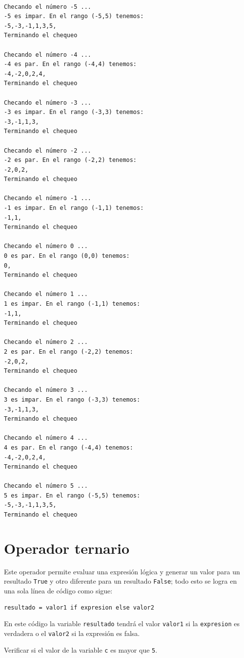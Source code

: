\documentclass[
  spanish,
  letterpaper,
]{scrbook}
\theoremstyle{definition}
\theoremstyle{remark}
\newcounter{quartocalloutexmno}
\newcommand{\quartocalloutexm}[1]{\refstepcounter{quartocalloutexmno}\label{#1}}
\begin{document}
\begin{verbatim}

Checando el número -5 ...
-5 es impar. En el rango (-5,5) tenemos:
-5,-3,-1,1,3,5,
Terminando el chequeo

Checando el número -4 ...
-4 es par. En el rango (-4,4) tenemos:
-4,-2,0,2,4,
Terminando el chequeo

Checando el número -3 ...
-3 es impar. En el rango (-3,3) tenemos:
-3,-1,1,3,
Terminando el chequeo

Checando el número -2 ...
-2 es par. En el rango (-2,2) tenemos:
-2,0,2,
Terminando el chequeo

Checando el número -1 ...
-1 es impar. En el rango (-1,1) tenemos:
-1,1,
Terminando el chequeo

Checando el número 0 ...
0 es par. En el rango (0,0) tenemos:
0,
Terminando el chequeo

Checando el número 1 ...
1 es impar. En el rango (-1,1) tenemos:
-1,1,
Terminando el chequeo

Checando el número 2 ...
2 es par. En el rango (-2,2) tenemos:
-2,0,2,
Terminando el chequeo

Checando el número 3 ...
3 es impar. En el rango (-3,3) tenemos:
-3,-1,1,3,
Terminando el chequeo

Checando el número 4 ...
4 es par. En el rango (-4,4) tenemos:
-4,-2,0,2,4,
Terminando el chequeo

Checando el número 5 ...
5 es impar. En el rango (-5,5) tenemos:
-5,-3,-1,1,3,5,
Terminando el chequeo
\end{verbatim}

\section{Operador ternario}\label{operador-ternario}

Este operador permite evaluar una expresión lógica y generar un valor
para un resultado \texttt{True} y otro diferente para un resultado
\texttt{False}; todo esto se logra en una sola línea de código como
sigue:

\begin{verbatim}
resultado = valor1 if expresion else valor2
\end{verbatim}

En este código la variable \texttt{resultado} tendrá el valor
\texttt{valor1} si la \texttt{expresion} es verdadera o el
\texttt{valor2} si la expresión es falsa.

\begin{tcolorbox}[enhanced jigsaw, colframe=quarto-callout-tip-color-frame, opacityback=0, toprule=.15mm, colback=white, coltitle=black, leftrule=.75mm, arc=.35mm, breakable, left=2mm, bottomtitle=1mm, rightrule=.15mm, bottomrule=.15mm, colbacktitle=quarto-callout-tip-color!10!white, toptitle=1mm, titlerule=0mm, opacitybacktitle=0.6, title={Tip \ref*{exm-h-7}: Operador ternario.}]

\quartocalloutexm{exm-h-7} 

Verificar si el valor de la variable \texttt{c} es mayor que \texttt{5}.

\end{tcolorbox}
\end{document}
